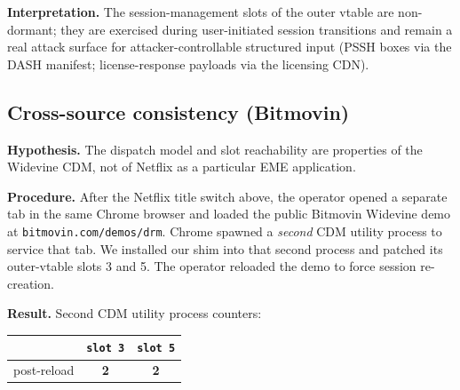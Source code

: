 \documentclass[11pt,letterpaper]{article}
\begin{document}
\textbf{Interpretation.} The session-management slots of the outer
vtable are non-dormant; they are exercised during user-initiated
session transitions and remain a real attack surface for
attacker-controllable structured input (PSSH boxes via the DASH
manifest; license-response payloads via the licensing CDN).

\subsection{Cross-source consistency (Bitmovin)}
\label{sec:findings-cross}

\textbf{Hypothesis.} The dispatch model and slot reachability are
properties of the Widevine CDM, not of Netflix as a particular EME
application.

\textbf{Procedure.} After the Netflix title switch above, the
operator opened a separate tab in the same Chrome browser and loaded
the public Bitmovin Widevine demo at
\texttt{bitmovin.com/demos/drm}. Chrome spawned a \emph{second} CDM
utility process to service that tab. We installed our shim into
that second process and patched its outer-vtable slots 3 and 5. The
operator reloaded the demo to force session re-creation.

\textbf{Result.} Second CDM utility process counters:

\begin{center}\small
\begin{tabular}{lcc}
\toprule
& \texttt{slot 3} & \texttt{slot 5} \\
\midrule
post-reload & \textbf{2} & \textbf{2} \\
\bottomrule
\end{tabular}
\end{center}
\end{document}
